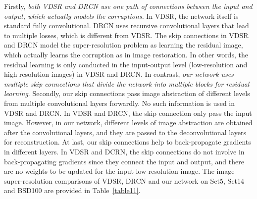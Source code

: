 Firstly, {\em both VDSR and DRCN use one path of connections between the input and output,
which actually models the corruptions.}  In VDSR, the network itself is standard fully convolutional.
DRCN uses recursive convolutional layers that lead to multiple losses, which is different from VDSR.
The skip connections in VDSR and DRCN model the super-resolution problem as learning the residual image,
which actually learns the corruption as in image restoration. In other words,
the residual learning is only conducted in the input-output level (low-resolution and high-resolution images)
in VDSR and DRCN. In contrast, {\em  our network uses multiple skip connections that divide the
network into multiple blocks for residual learning}. Secondly, our skip connections pass
image abstraction of different levels from multiple convolutional layers forwardly.
No such information is used in VDSR and DRCN. In VDSR and DRCN,
the skip connection only pass the input image. However, in our network,
different levels of image abstraction are obtained after the convolutional layers,
and they are passed to the deconvolutional layers for reconstruction. At last,
our skip connections help to back-propagate gradients in different layers. In VDSR and DCRN,
the skip connections do not involve in back-propagating gradients since they connect the input and output,
and there are no weights to be updated for the input low-resolution image.
The image super-resolution comparisons of VDSR, DRCN and our network on Set5,
Set14 and BSD100 are provided in Table~\ref{table11}.




